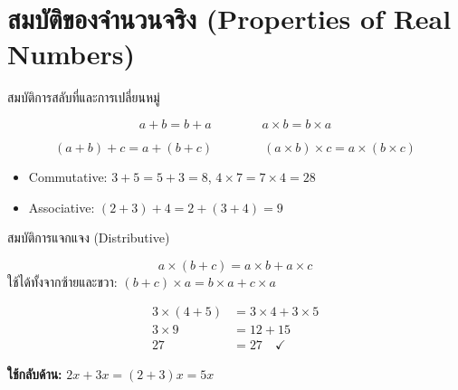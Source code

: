 \documentclass[11pt, aspectratio=169]{beamer}
\begin{document}
\section{สมบัติของจำนวนจริง (Properties of Real Numbers)}

\begin{frame}{สมบัติการสลับที่และการเปลี่ยนหมู่}
  \begin{explanation}
    \[
      a + b = b + a \qquad\qquad a \times b = b \times a
    \]
  \end{explanation}

  \begin{explanation}
    \[
      (a + b) + c = a + (b + c) \qquad\qquad (a \times b) \times c = a \times (b \times c)
    \]
  \end{explanation}

  \begin{exambox}[ตัวอย่าง]
    \begin{itemize}
      \item Commutative: $3 + 5 = 5 + 3 = 8$, \quad $4 \times 7 = 7 \times 4 = 28$
      \item Associative: $(2 + 3) + 4 = 2 + (3 + 4) = 9$
    \end{itemize}
  \end{exambox}
\end{frame}

\begin{frame}{สมบัติการแจกแจง (Distributive)}
  \begin{explanation}
    \[
      a \times (b + c) = a \times b + a \times c
    \]
    ใช้ได้ทั้งจากซ้ายและขวา: $(b + c) \times a = b \times a + c \times a$
  \end{explanation}

  \begin{exambox}[ตัวอย่าง]
    \begin{align*}
      3 \times (4 + 5) &= 3 \times 4 + 3 \times 5 \\
      3 \times 9 &= 12 + 15 \\
      27 &= 27 \quad \checkmark
    \end{align*}

    \textbf{ใช้กลับด้าน:} $2x + 3x = (2+3)x = 5x$
  \end{exambox}
\end{frame}
\end{document}
